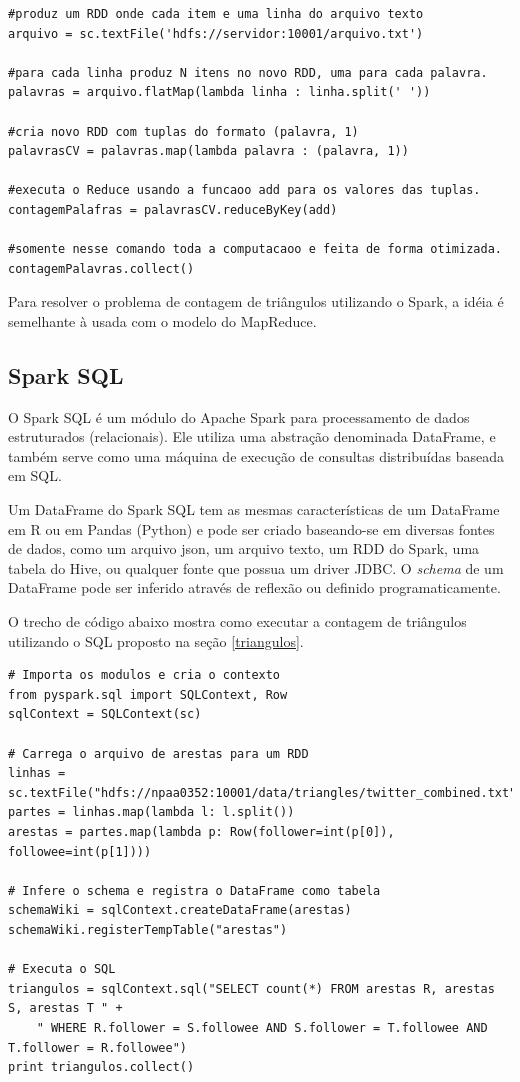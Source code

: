 \begin{lstlisting}[style=MyPythonStyle]
#produz um RDD onde cada item e uma linha do arquivo texto
arquivo = sc.textFile('hdfs://servidor:10001/arquivo.txt') 

#para cada linha produz N itens no novo RDD, uma para cada palavra.
palavras = arquivo.flatMap(lambda linha : linha.split(' ')) 

#cria novo RDD com tuplas do formato (palavra, 1)
palavrasCV = palavras.map(lambda palavra : (palavra, 1)) 

#executa o Reduce usando a funcaoo add para os valores das tuplas.
contagemPalafras = palavrasCV.reduceByKey(add) 

#somente nesse comando toda a computacaoo e feita de forma otimizada.
contagemPalavras.collect() 
\end{lstlisting}

Para resolver o problema de contagem de triângulos utilizando o Spark, a idéia é semelhante à usada com o modelo do MapReduce.

\subsection{Spark SQL}
O Spark SQL é um módulo do Apache Spark para processamento de dados estruturados (relacionais). Ele utiliza uma abstração denominada DataFrame, e também serve como uma máquina de execução de consultas distribuídas baseada em SQL. 

Um DataFrame do Spark SQL tem as mesmas características de um DataFrame em R ou em Pandas (Python) e pode ser criado baseando-se em diversas fontes de dados, como um arquivo json, um arquivo texto, um RDD do Spark, uma tabela do Hive, ou qualquer fonte que possua um driver JDBC. O \textit{schema} de um DataFrame pode ser inferido através de reflexão ou definido programaticamente. 

O trecho de código abaixo mostra como executar a contagem de triângulos utilizando o SQL proposto na seção \ref{triangulos}.

\begin{lstlisting}[style=MyPythonStyle]
# Importa os modulos e cria o contexto
from pyspark.sql import SQLContext, Row
sqlContext = SQLContext(sc)

# Carrega o arquivo de arestas para um RDD
linhas = sc.textFile("hdfs://npaa0352:10001/data/triangles/twitter_combined.txt")
partes = linhas.map(lambda l: l.split())
arestas = partes.map(lambda p: Row(follower=int(p[0]), followee=int(p[1])))

# Infere o schema e registra o DataFrame como tabela
schemaWiki = sqlContext.createDataFrame(arestas)
schemaWiki.registerTempTable("arestas")

# Executa o SQL
triangulos = sqlContext.sql("SELECT count(*) FROM arestas R, arestas S, arestas T " +
    " WHERE R.follower = S.followee AND S.follower = T.followee AND T.follower = R.followee")
print triangulos.collect()
\end{lstlisting}



